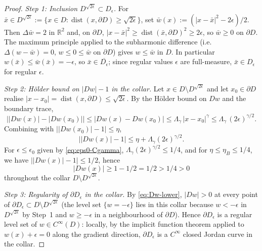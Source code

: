 \documentclass[11pt]{amsart}
\newcommand{\R}{\mathbb R}
\DeclareMathOperator{\dist}{dist}
\begin{document}
\begin{proof}
\emph{Step 1: Inclusion $D^{\sqrt{2\epsilon}}\subset D_\epsilon$.}
For $\bar x\in D^{\sqrt{2\epsilon}}:=\{x\in D:\dist(x,\partial D)
\ge\sqrt{2\epsilon}\}$, set $\bar w(x):=(|x-\bar x|^2-2\epsilon)/2$.
Then $\Delta\bar w=2$ in $\R^2$ and, on $\partial D$,
$|x-\bar x|^2\ge\dist(\bar x,\partial D)^2\ge 2\epsilon$, so $\bar
w\ge 0$ on $\partial D$.  The maximum principle applied to the
subharmonic difference (i.e.\ $\Delta(w-\bar w)=0$, $w\le 0\le\bar w$
on $\partial D$) gives $w\le\bar w$ in $D$.  In particular
$w(\bar x)\le\bar w(\bar x)=-\epsilon$, so $\bar x\in\overline{D_\epsilon}$;
since regular values $\epsilon$ are full-measure, $\bar x\in
D_\epsilon$ for regular $\epsilon$.

\emph{Step 2: Hölder bound on $|Dw|-1$ in the collar.}
Let $x\in D\setminus D^{\sqrt{2\epsilon}}$ and let $x_0\in\partial
D$ realise $|x-x_0|=\dist(x,\partial D)\le\sqrt{2\epsilon}$.  By the
Hölder bound on $Dw$ and the boundary trace,
\[
\bigl||Dw(x)|-|Dw(x_0)|\bigr|
\le|Dw(x)-Dw(x_0)|\le\Lambda_\gamma\,|x-x_0|^\gamma
\le\Lambda_\gamma\,(2\epsilon)^{\gamma/2}.
\]
Combining with $\bigl||Dw(x_0)|-1\bigr|\le\eta$,
\[
\bigl||Dw(x)|-1\bigr|\le\eta+\Lambda_\gamma(2\epsilon)^{\gamma/2}.
\]
For $\epsilon\le\epsilon_0$ given by \eqref{eq:eps0-Cgamma},
$\Lambda_\gamma(2\epsilon)^{\gamma/2}\le 1/4$, and for
$\eta\le\eta_B\le 1/4$, we have $\bigl||Dw(x)|-1\bigr|\le 1/2$, hence
\begin{equation}\label{eq:Dw-lower}
   |Dw(x)|\ge 1-1/2=1/2>1/4>0
\end{equation}
throughout the collar $D\setminus D^{\sqrt{2\epsilon}}$.

\emph{Step 3: Regularity of $\partial D_\epsilon$ in the collar.}
By \eqref{eq:Dw-lower}, $|Dw|>0$ at every point of
$\partial D_\epsilon\subset D\setminus D^{\sqrt{2\epsilon}}$
\textup{(the level set $\{w=-\epsilon\}$ lies in this collar because
$w<-\epsilon$ in $D^{\sqrt{2\epsilon}}$ by Step~1 and
$w\ge-\epsilon$ in a neighbourhood of $\partial D$).}  Hence
$\partial D_\epsilon$ is a regular level set of $w\in C^\infty(D)$:
locally, by the implicit function theorem applied to $w(x)+\epsilon=
0$ along the gradient direction, $\partial D_\epsilon$ is a
$C^\infty$ closed Jordan curve in the collar.


\end{proof}
\end{document}
